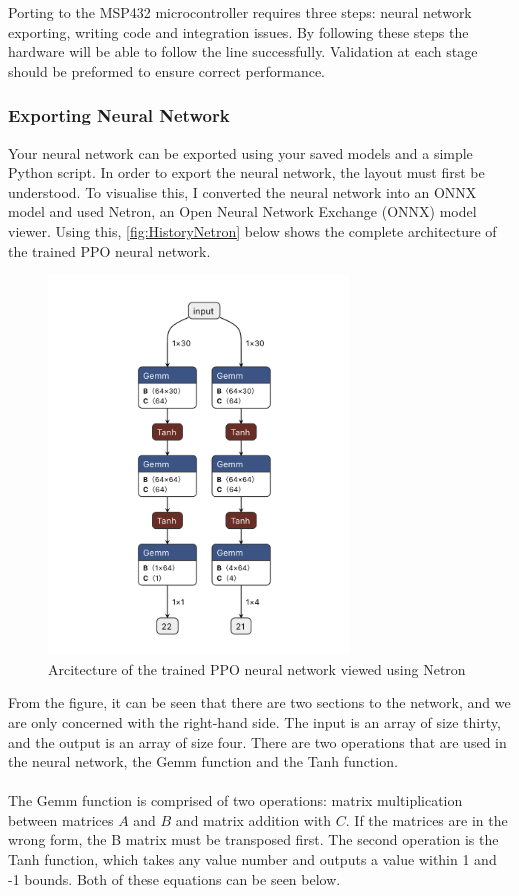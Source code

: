 \documentclass[a4paper,12pt]{article}
\begin{document}
Porting to the MSP432 microcontroller requires three steps: neural network exporting, writing code and integration issues. By following these steps the hardware will be able to follow the line successfully. Validation at each stage should be preformed to ensure correct performance.

\subsubsection{Exporting Neural Network}
Your neural network can be exported using your saved models and a simple Python script. In order to export the neural network, the layout must first be understood. To visualise this, I converted the neural network into an ONNX model and used Netron, an Open Neural Network Exchange (ONNX) model viewer. Using this, \autoref{fig:HistoryNetron} below shows the complete architecture of the trained PPO neural network. 

\begin{figure}[H]
\centering
\includegraphics[width=8cm]{imgs/HistoryNetron.png}
\caption{Arcitecture of the trained PPO neural network viewed using Netron}
\label{fig:HistoryNetron}
\end{figure}
From the figure, it can be seen that there are two sections to the network, and we are only concerned with the right-hand side. The input is an array of size thirty, and the output is an array of size four. There are two operations that are used in the neural network, the Gemm function and the Tanh function. 
\\\\
The Gemm function is comprised of two operations: matrix multiplication between matrices $A$ and $B$ and matrix addition with $C$. If the matrices are in the wrong form, the B matrix must be transposed first. The second operation is the Tanh function, which takes any value number and outputs a value within 1 and -1 bounds. Both of these equations can be seen below. 
\end{document}
